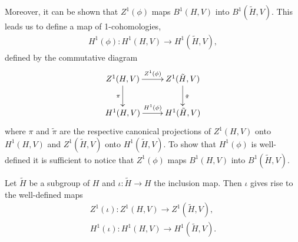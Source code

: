 Moreover, it can be shown that $Z^1(\phi)$ maps $B^1(H, V)$ into $B^1(\tilde{H}, V)$. This leads us to define a map of 1-cohomologies,
\begin{eqnarray*}
	H^1(\phi):H^1(H, V) \rightarrow H^1(\tilde{H}, V),
\end{eqnarray*}
defined by the commutative diagram
\begin{displaymath}
	\xymatrix{
	Z^1(H, V) \ar[d]_{\pi} \ar[r]^{Z^1(\phi)} & Z^1(\tilde{H}, V) \ar[d]^{\tilde{\pi}}\\
	H^1(H, V) \ar[r]^{H^1(\phi)} & H^1(\tilde{H}, V)
	}
\end{displaymath}
where $\pi$ and $\tilde\pi$ are the respective canonical projections of $Z^1(H, V)$ onto $H^1(H, V)$ and $Z^1(\tilde{H}, V)$ onto $H^1(\tilde{H}, V)$. To show that $H^1(\phi)$ is well-defined it is sufficient to notice that $Z^1(\phi)$ maps $B^1(H, V)$ into $B^1(\tilde{H}, V)$.

\begin{example}
Let $\tilde{H}$ be a subgroup of $H$ and $\iota:\tilde{H}\rightarrow H$ the inclusion map. Then $\iota$ gives rise to the well-defined maps
\begin{eqnarray*}
  Z^1(\iota): Z^1(H, V) \rightarrow Z^1(\tilde{H}, V), \\
H^1(\iota):H^1(H, V)\rightarrow H^1(\tilde{H}, V).
\end{eqnarray*}
\end{example}

